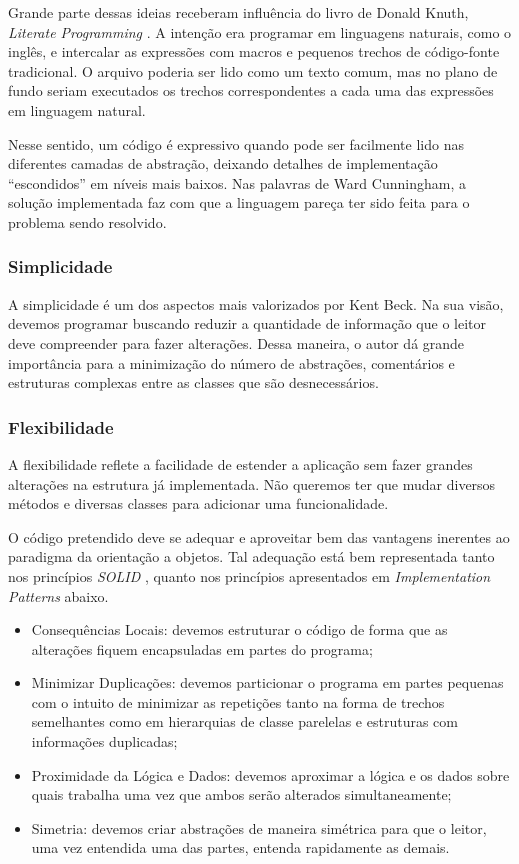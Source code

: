 Grande parte dessas ideias receberam influência do livro de Donald Knuth, \textit{Literate Programming} \citep{Knuth92}. A intenção era programar em linguagens naturais, como o inglês, e intercalar as expressões com macros e pequenos trechos de código-fonte tradicional. O arquivo poderia ser lido como um texto comum, mas no plano de fundo seriam executados os trechos correspondentes a cada uma das expressões em linguagem natural.

Nesse sentido, um código é expressivo quando pode ser facilmente lido nas diferentes camadas de abstração, deixando detalhes de implementação ``escondidos'' em níveis mais baixos. Nas palavras de Ward Cunningham, a solução implementada faz com que a linguagem pareça ter sido feita para o problema sendo resolvido.

\subsubsection{Simplicidade}
A simplicidade é um dos aspectos mais valorizados por Kent Beck. Na sua visão, devemos programar buscando reduzir a quantidade de informação que o leitor deve compreender para fazer alterações. Dessa maneira, o autor dá grande importância para a minimização do número de abstrações, comentários e estruturas complexas entre as classes que são desnecessários.

\subsubsection{Flexibilidade}
A flexibilidade reflete a facilidade de estender a aplicação sem fazer grandes alterações na estrutura já implementada. Não queremos ter que mudar diversos métodos e diversas classes para adicionar uma funcionalidade.

O código pretendido deve se adequar e aproveitar bem das vantagens inerentes ao paradigma da orientação a objetos. Tal adequação está bem representada tanto nos princípios \textit{SOLID} \citep{Martin2000}, quanto nos princípios apresentados em \textit{Implementation Patterns} abaixo.

\begin{itemize}
	\item Consequências Locais: devemos estruturar o código de forma que as alterações fiquem encapsuladas em partes do programa;
	\item Minimizar Duplicações: devemos particionar o programa em partes pequenas com o intuito de minimizar as repetições tanto na forma de trechos semelhantes como em hierarquias de classe parelelas e estruturas com informações duplicadas;
	\item Proximidade da Lógica e Dados: devemos aproximar a lógica e os dados sobre quais trabalha uma vez que ambos serão alterados simultaneamente;
	\item Simetria: devemos criar abstrações de maneira simétrica para que o leitor, uma vez entendida uma das partes, entenda rapidamente as demais.
\end{itemize}

